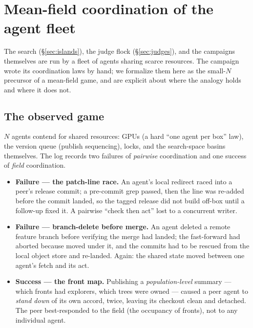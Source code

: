 \documentclass[11pt]{article}
\begin{document}
\section{Mean-field coordination of the agent fleet}
\label{sec:meanfield}

The search (\S\ref{sec:islands}), the judge flock (\S\ref{sec:judges}), and the campaigns themselves are run
by a fleet of agents sharing scarce resources. The campaign wrote its coordination laws by hand; we formalize
them here as the small-$N$ precursor of a mean-field game, and are explicit about where the analogy holds and
where it does not.

\subsection{The observed game}
\label{sec:mf-game}

$N$ agents contend for shared resources: GPUs (a hard ``one agent per box'' law), the 
version queue (publish sequencing),  locks, and the search-space basins themselves. The log
records two failures of \emph{pairwise} coordination and one success of \emph{field} coordination.

\begin{itemize}[leftmargin=1.4em,itemsep=2pt,topsep=2pt]
\item \textbf{Failure --- the patch-line race.} An agent's local  redirect raced into
a peer's release commit; a pre-commit grep passed, then the line was re-added before the commit landed, so
the tagged release did not build off-box until a follow-up fixed it. A pairwise ``check then act'' lost to a
concurrent writer.
\item \textbf{Failure --- branch-delete before merge.} An agent deleted a remote feature branch before
verifying the merge had landed; the fast-forward had aborted because  moved under it, and the
commits had to be rescued from the local object store and re-landed. Again: the shared state moved between
one agent's fetch and its act.
\item \textbf{Success --- the front map.} Publishing a \emph{population-level} summary --- which fronts had
explorers, which trees were owned --- caused a peer agent to \emph{stand down} of its own accord, twice,
leaving its checkout clean and detached. The peer best-responded to the field (the occupancy of fronts), not
to any individual agent.
\end{itemize}
\end{document}
